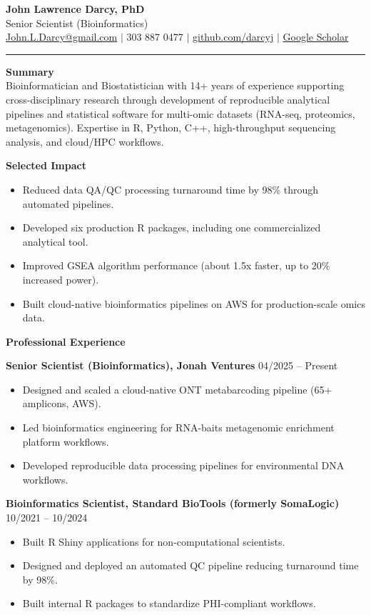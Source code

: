 \documentclass[11pt]{article}
\begin{document}
{\LARGE \textbf{John Lawrence Darcy, PhD}}\\
Senior Scientist (Bioinformatics)\\
\href{mailto:John.L.Darcy@gmail.com}{John.L.Darcy@gmail.com} $\vert$ 303 887 0477 $\vert$ \href{https://github.com/darcyj}{github.com/darcyj} $\vert$ \href{https://scholar.google.com/citations?user=z24F3PYAAAAJ&hl=en}{Google Scholar}

\vspace{6pt}
\hrule
\vspace{8pt}

\textbf{Summary}\\
Bioinformatician and Biostatistician with 14+ years of experience supporting cross-disciplinary research through development of reproducible analytical pipelines and statistical software for multi-omic datasets (RNA-seq, proteomics, metagenomics). Expertise in R, Python, C++, high-throughput sequencing analysis, and cloud/HPC workflows.

\vspace{4pt}
\textbf{Selected Impact}
\begin{itemize}
  \item Reduced data QA/QC processing turnaround time by 98\% through automated pipelines.
  \item Developed six production R packages, including one commercialized analytical tool.
  \item Improved GSEA algorithm performance (about 1.5x faster, up to 20\% increased power).
  \item Built cloud-native bioinformatics pipelines on AWS for production-scale omics data.
\end{itemize}

\textbf{Professional Experience}

\textbf{Senior Scientist (Bioinformatics), Jonah Ventures} \hfill 04/2025 -- Present
\begin{itemize}
  \item Designed and scaled a cloud-native ONT metabarcoding pipeline (65+ amplicons, AWS).
  \item Led bioinformatics engineering for RNA-baits metagenomic enrichment platform workflows.
  \item Developed reproducible data processing pipelines for environmental DNA workflows.
\end{itemize}

\textbf{Bioinformatics Scientist, Standard BioTools (formerly SomaLogic)} \hfill 10/2021 -- 10/2024
\begin{itemize}
  \item Built R Shiny applications for non-computational scientists.
  \item Designed and deployed an automated QC pipeline reducing turnaround time by 98\%.
  \item Built internal R packages to standardize PHI-compliant workflows.
\end{itemize}
\end{document}
